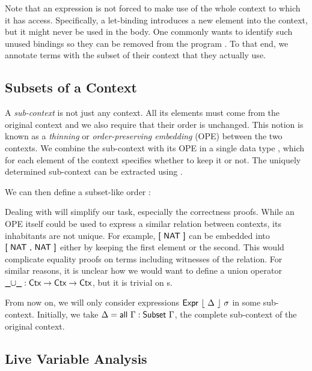 \documentclass[11pt,a4paper]{article}
\newcommand{\Floor}[1]{\lfloor #1 \rfloor\xspace}
\newcommand{\AgdaFloor}[1]{\AgdaFunction{$\lfloor$}\ #1\ \AgdaFunction{$\rfloor$}}
\begin{document}
Note that an expression is not forced to make use of the whole context to which it has access.
Specifically, a let-binding introduces a new element into the context, but it might never be used
in the body.
One commonly wants to identify such unused bindings so they can be removed from the program
\cite[Live Variable Analysis]{nielsen1999analysis}.
To that end, we annotate terms with the subset of their context that they actually use.


\subsection{Subsets of a Context}

A \emph{sub-context} is not just any context.
All its elements must come from the original context and we also require that their order is unchanged.
This notion is known as a \emph{thinning} or \emph{order-preserving embedding} (OPE) \cite{chapman2009type}
between the two contexts.
We combine the sub-context with its OPE in a single data type ,
which for each element of the context specifies whether to keep it or not.
The uniquely determined sub-context can be extracted using \AgdaFunction{$\Floor{\_}$}.

\CodeSubsetSubset

We can then define a subset-like order \AgdaFunction{$\subseteq$}:

\CodeSubsetOpSubseteq

Dealing with  will simplify our task, especially the correctness proofs.
While an OPE itself could be used to express a similar relation between contexts,
its inhabitants are not unique.
For example, $\AgdaInductiveConstructor{[\ NAT\ ]}$
can be embedded into $\AgdaInductiveConstructor{[\ NAT\ ,\ NAT\ ]}$
either by keeping the first element or the second.
This would complicate equality proofs on terms including witnesses of the relation.
For similar reasons, it is unclear how we would want to define a union operator
$\AgdaFunction{$\_\cup\_$} : \AgdaDatatype{Ctx} \to \AgdaDatatype{Ctx} \to \AgdaDatatype{Ctx}$,
but it is trivial on s.

From now on, we will only consider expressions
$\AgdaDatatype{Expr}\ \AgdaFloor{\Delta}\ \sigma$ in some sub-context.
Initially, we take $\Delta = \AgdaFunction{all}\ \Gamma : \AgdaDatatype{Subset}\ \Gamma$,
the complete sub-context of the original context.


\subsection{Live Variable Analysis}
\end{document}
